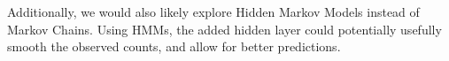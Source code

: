 \documentclass[journal]{IEEEtran}
\begin{document}
Additionally, we would also likely explore Hidden Markov Models instead of Markov Chains. Using HMMs, the added hidden layer could potentially usefully smooth the observed counts, and allow for better predictions.



%
%



%
%
\end{document}
